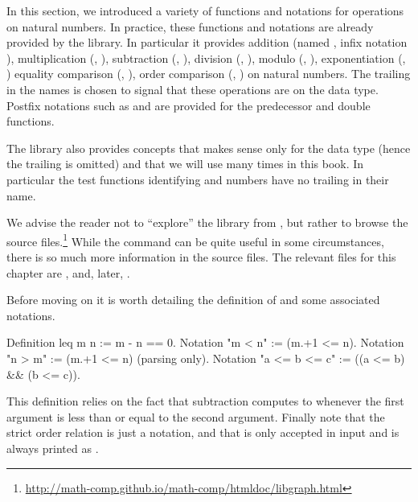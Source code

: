 In this section, we introduced a variety of functions and notations
for operations on natural numbers.  In practice, these functions and
notations are already provided by the \mcbMC{} library.  In particular
it provides addition (named , infix notation \C{+}), 
multiplication
(, \C{*}), subtraction (, \C{-}), division (,
\C{\%/}),  modulo (, \C{\%\%}), exponentiation (, \C{\^})
equality comparison (, \C{==}), order
comparison (, \C{<=}) on natural numbers.  The trailing  in
the names is chosen to signal that these operations are on the  data
type.  Postfix notations such as  and  are provided for
the predecessor and double functions.

The \mcbMC{} library also provides concepts that makes sense only
for the  data type (hence the trailing  is omitted) and
that we will use many times in this book.  In particular the
test functions identifying  and  numbers have no trailing
 in their name.

We advise the reader not to ``explore'' the library from \Coq{}, but
rather to browse the source files.\footnote{\url{http://math-comp.github.io/math-comp/htmldoc/libgraph.html}}
While the 
command can be quite useful in some circumstances, there is so much more
information in the source files.  
The relevant files for this chapter are , 
and, later, .


Before moving on it is worth detailing the definition of 
and some associated notations.

\begin{coq}{}{}
Definition leq m n := m - n == 0.
Notation "m < n"  := (m.+1 <= n).
Notation "n > m"  := (m.+1 <= n) (parsing only).
Notation "a <= b <= c" := ((a <= b) && (b <= c)).
\end{coq}
This definition relies on the fact that subtraction computes to  whenever
the first argument is less than or equal to the second argument.
 Finally note that the strict order
relation is just a notation, and that  is only accepted in input
and is always printed as  .




